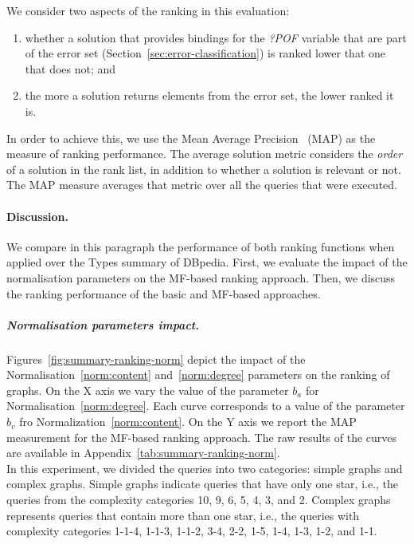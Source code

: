 We consider two aspects of the ranking in this evaluation:
\begin{enumerate}
	\item whether a solution that provides bindings for the \emph{?POF} variable that are part of the error set (Section~\ref{sec:error-classification}) is ranked lower that one that does not; and
	\item the more a solution returns elements from the error set, the lower ranked it is.
\end{enumerate}
In order to achieve this, we use the Mean Average Precision~\cite{manning:2008:iir} (MAP) as the measure of ranking performance.
The average solution metric considers the \emph{order} of a solution in the rank list, in addition to whether a solution is relevant or not.
The MAP measure averages that metric over all the queries that were executed.

\paragraph{Discussion.}

We compare in this paragraph the performance of both ranking functions when applied over the Types summary of DBpedia. First, we evaluate the impact of the normalisation parameters on the MF-based ranking approach. Then, we discuss the ranking performance of the basic and MF-based approaches.

\subparagraph{Normalisation parameters impact.}

Figures~\ref{fig:summary-ranking-norm} depict the impact of the Normalisation~\ref{norm:content} and~\ref{norm:degree} parameters on the ranking of graphs. On the X axis we vary the value of the parameter $b_a$ for Normalisation~\ref{norm:degree}. Each curve corresponds to a value of the parameter $b_v$ fro Normalization~\ref{norm:content}. On the Y axis we report the MAP measurement for the MF-based ranking approach. The raw results of the curves are available in Appendix~\ref{tab:summary-ranking-norm}.\\

In this experiment, we divided the queries into two categories: simple graphs and complex graphs. Simple graphs indicate queries that have only one star, i.e., the queries from the complexity categories 10, 9, 6, 5, 4, 3, and 2. Complex graphs represents queries that contain more than one star, i.e., the queries with complexity categories 1-1-4, 1-1-3, 1-1-2, 3-4, 2-2, 1-5, 1-4, 1-3, 1-2, and 1-1.

